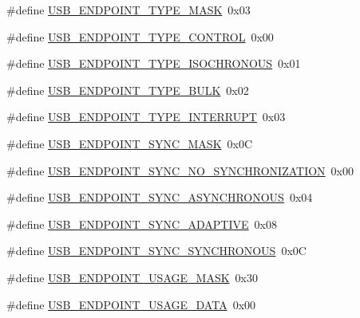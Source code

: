 \begin{DoxyCompactItemize}
\item 
\#define \hyperlink{group___u_s_b_d___core_gacd114fdf068aaa69407358ee5ccfd170}{U\+S\+B\+\_\+\+E\+N\+D\+P\+O\+I\+N\+T\+\_\+\+T\+Y\+P\+E\+\_\+\+M\+A\+SK}~0x03
\item 
\#define \hyperlink{group___u_s_b_d___core_ga6a51ed22b06e5ca0f76a35b6bac8d73a}{U\+S\+B\+\_\+\+E\+N\+D\+P\+O\+I\+N\+T\+\_\+\+T\+Y\+P\+E\+\_\+\+C\+O\+N\+T\+R\+OL}~0x00
\item 
\#define \hyperlink{group___u_s_b_d___core_gab05aae4a5d079b8dfb6a9cb1325ea6e5}{U\+S\+B\+\_\+\+E\+N\+D\+P\+O\+I\+N\+T\+\_\+\+T\+Y\+P\+E\+\_\+\+I\+S\+O\+C\+H\+R\+O\+N\+O\+US}~0x01
\item 
\#define \hyperlink{group___u_s_b_d___core_gaf4bac84d4576dc8f74f39dc75749e3dc}{U\+S\+B\+\_\+\+E\+N\+D\+P\+O\+I\+N\+T\+\_\+\+T\+Y\+P\+E\+\_\+\+B\+U\+LK}~0x02
\item 
\#define \hyperlink{group___u_s_b_d___core_ga2cb5aa69a03df20aab217b808ad692a6}{U\+S\+B\+\_\+\+E\+N\+D\+P\+O\+I\+N\+T\+\_\+\+T\+Y\+P\+E\+\_\+\+I\+N\+T\+E\+R\+R\+U\+PT}~0x03
\item 
\#define \hyperlink{group___u_s_b_d___core_ga91301868eb0b52506fc9bc02b131f783}{U\+S\+B\+\_\+\+E\+N\+D\+P\+O\+I\+N\+T\+\_\+\+S\+Y\+N\+C\+\_\+\+M\+A\+SK}~0x0C
\item 
\#define \hyperlink{group___u_s_b_d___core_ga7733e58f8c4fbcef1533eb02f375aeb0}{U\+S\+B\+\_\+\+E\+N\+D\+P\+O\+I\+N\+T\+\_\+\+S\+Y\+N\+C\+\_\+\+N\+O\+\_\+\+S\+Y\+N\+C\+H\+R\+O\+N\+I\+Z\+A\+T\+I\+ON}~0x00
\item 
\#define \hyperlink{group___u_s_b_d___core_gad1bb5cc537ea61634cb61c8c364c9a6f}{U\+S\+B\+\_\+\+E\+N\+D\+P\+O\+I\+N\+T\+\_\+\+S\+Y\+N\+C\+\_\+\+A\+S\+Y\+N\+C\+H\+R\+O\+N\+O\+US}~0x04
\item 
\#define \hyperlink{group___u_s_b_d___core_gaa7808914116fe45223462e68d6f8aa5d}{U\+S\+B\+\_\+\+E\+N\+D\+P\+O\+I\+N\+T\+\_\+\+S\+Y\+N\+C\+\_\+\+A\+D\+A\+P\+T\+I\+VE}~0x08
\item 
\#define \hyperlink{group___u_s_b_d___core_ga0309c68623fb48fdc621f15dabc579f2}{U\+S\+B\+\_\+\+E\+N\+D\+P\+O\+I\+N\+T\+\_\+\+S\+Y\+N\+C\+\_\+\+S\+Y\+N\+C\+H\+R\+O\+N\+O\+US}~0x0C
\item 
\#define \hyperlink{group___u_s_b_d___core_ga834006343743238a5eb1d273ef3226ae}{U\+S\+B\+\_\+\+E\+N\+D\+P\+O\+I\+N\+T\+\_\+\+U\+S\+A\+G\+E\+\_\+\+M\+A\+SK}~0x30
\item 
\#define \hyperlink{group___u_s_b_d___core_gac852b5e62e4e577b1b43239ae190908a}{U\+S\+B\+\_\+\+E\+N\+D\+P\+O\+I\+N\+T\+\_\+\+U\+S\+A\+G\+E\+\_\+\+D\+A\+TA}~0x00

\end{DoxyCompactItemize}
